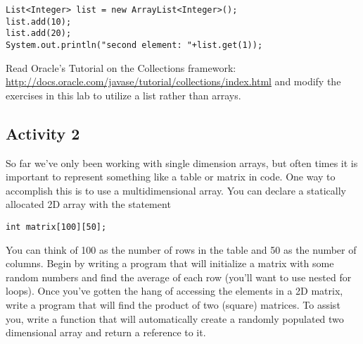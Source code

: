 \documentclass[12pt]{scrartcl}
\begin{document}
\begin{verbatim}
List<Integer> list = new ArrayList<Integer>();
list.add(10);
list.add(20);
System.out.println("second element: "+list.get(1));
\end{verbatim}

Read Oracle's Tutorial on the Collections framework: 
\url{http://docs.oracle.com/javase/tutorial/collections/index.html} and modify 
the exercises in this lab to utilize a list rather than arrays.

\subsection{Activity 2}
So far we've only been working with single dimension arrays, but often times it 
is important to represent something like a table or matrix in code.  One way to 
accomplish this is to use a multidimensional array.  You can declare a statically 
allocated 2D array with the statement 

\texttt{int matrix[100][50];}

You can think of 100 as the number of rows in the table and 50 as the number 
of columns.  Begin by writing a program that will initialize a matrix with some 
random numbers and find the average of each row (you'll want to use nested 
for loops).  Once you've gotten the hang of accessing the elements in a 2D
matrix, write a program that will find the product of two (square) matrices.  
To assist you, write a function that will automatically create a randomly populated 
two dimensional array and return a reference to it.
\end{document}
